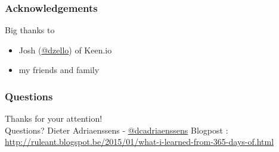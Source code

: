 \documentclass[14pt]{beamer}
\begin{document}
  \begin{frame}
    \frametitle{Acknowledgements}
    Big thanks to
    \begin{itemize}
      \item Josh (\href{https://twitter.com/dzello}{@dzello}) of Keen.io
      \item my friends and family
    \end{itemize}
  \end{frame}
  \begin{frame}
   \frametitle{Questions}
    Thanks for your attention!\\
    Questions?
    \vfill
    Dieter Adriaenssens - \href{https://twitter.com/dcadriaenssens}{\small{@dcadriaenssens}}
    \vfill
    Blogpost : \href{http://ruleant.blogspot.be/2015/01/what-i-learned-from-365-days-of.html}{http://ruleant.blogspot.be/2015/01/what-i-learned-from-365-days-of.html}
  \end{frame}
\end{document}
